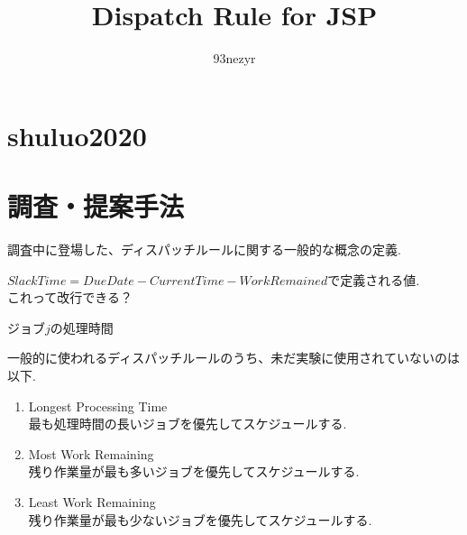 \documentclass{ltjsarticle}
\begin{document}
\title{Dispatch Rule for JSP}
\author{93nezyr}
\maketitle

\section{shuluo2020}

\section{調査・提案手法}

調査中に登場した、ディスパッチルールに関する一般的な概念の定義.

\begin{description}[style=multiline, leftmargin=10em]
  \item[$SlackTime$] $SlackTime = DueDate - CurrentTime - WorkRemained$で定義される値. \\
  これって改行できる？
  \item[$P_j$] ジョブ$j$の処理時間
\end{description}

一般的に使われるディスパッチルールのうち、未だ実験に使用されていないのは以下.

\begin{enumerate}
  \item Longest Processing Time \\
        最も処理時間の長いジョブを優先してスケジュールする.
  \item Most Work Remaining \\
        残り作業量が最も多いジョブを優先してスケジュールする.
  \item Least Work Remaining \\
        残り作業量が最も少ないジョブを優先してスケジュールする.
\end{enumerate}
\end{document}
